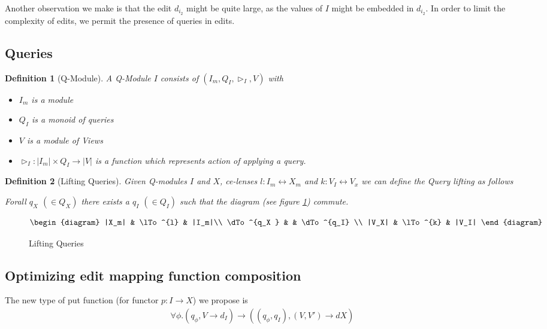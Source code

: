 \documentclass[a4paper,10pt]{article}
\newtheorem{definition}{Definition}
\begin{document}
Another observation we make is that the edit $d_{i_2}$ might be quite large, as
the values of $I$ might be embedded in $d_{i_2}$. In order to limit the complexity
of edits, we permit the presence of queries in edits.

\subsection{Queries}
\begin{definition}[Q-Module] A Q-Module $I$ consists of $(I_m,Q_I,\rhd_{I},V)$ with
\begin{itemize}
\item $I_m$ is a module
\item $Q_I$ is a monoid of queries
\item $V$ is a module of Views
\item $\rhd_{I} : |I_m| \times Q_I \to |V|$ is a function which represents action of applying a query.
\end{itemize}
\end{definition} 

\begin{definition}[Lifting Queries]
Given Q-modules $I$ and $X$, ce-lenses $l : I_m \leftrightarrow X_m$ and $k : V_I \leftrightarrow V_x$ we can define the Query lifting as follows

Forall $q_X$ $(\in Q_X)$ there exists a $q_I$ $(\in Q_I)$ such that the diagram (see figure \ref{fig:lifting-queries}) commute. 
\end{definition}

\begin{figure}[ht]
\begin{displaymath}
\begin{diagram}
|X_m| & \lTo^{l} & |I_m|\\
\dTo^{q_X } & & \dTo^{q_I} \\
|V_X| & \lTo^{k} & |V_I| 
\end{diagram}
\end{displaymath}
\caption{Lifting Queries}
\label{fig:lifting-queries}
\end{figure}

\subsection{Optimizing edit mapping function composition}
The new type of put function (for functor $p: I \to X$) we propose is
\begin{align*}
\forall \phi. (q_{\phi}, V \to d_I) \to ((q_{\phi},q_I), (V,V') \to dX) 
\end{align*}
\end{document}
